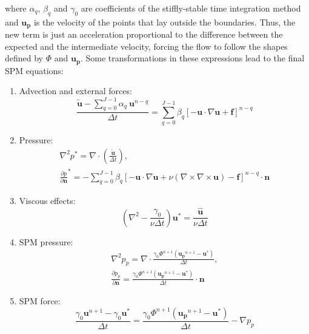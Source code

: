 where $\alpha_q$, $\beta_q$ and $\gamma_0$ are coefficients of the
stiffly-stable time integration method and $\mathbf{u_p}$ is the velocity of
the points that lay outside the boundaries. Thus, the new term is just an
acceleration proportional to the difference between the expected and the
intermediate velocity, forcing the flow to follow the shapes defined by $\Phi$
and $\mathbf{u_p}$. Some transformations in these expressions lead to the final
SPM equations:

\begin{enumerate}
    \item Advection and external forces:
        \begin{equation}
            \frac{\mathbf{\tilde{u}}-\sum_{q=0}^{J-1}\alpha_q~\mathbf{u}^{n-q}}
                {\Delta t} = \sum_{q=0}^{J-1}\beta_q\left[-\mathbf{u}\cdot
                \nabla\mathbf{u}+\mathbf{f}\right]^{n-q}
        \end{equation}
    \item Pressure:
        \begin{subequations}
        \begin{gather}
            \nabla^2 p^* = \nabla\cdot\left(\frac{\mathbf{\tilde{u}}}
                {\Delta t}\right),\\
            \frac{\partial p}{\partial\mathbf{n}}^* = -\sum_{q=0}^{J-1}\beta_q
                \left[-\mathbf{u}\cdot\nabla\mathbf{u}+\nu(\nabla\times\nabla
                \times\mathbf{u})-\mathbf{f}\right]^{n-q}\cdot\mathbf{n}
        \end{gather}
        \end{subequations}
    \item Viscous effects:
        \begin{equation}
            \left(\nabla^2 - \frac{\gamma_0}{\nu\Delta t}\right)\mathbf{u^*} =
                \frac{\mathbf{\hat{u}}}{\nu\Delta t}
        \end{equation}
    \item SPM pressure:
        \begin{subequations}
        \begin{gather}
            \nabla^2 p_p = \nabla\cdot\frac{\gamma_0\Phi^{n+1}(
                \mathbf{u_p}^{n+1}-\mathbf{u^*})}{\Delta t},\\[3mm]
            \frac{\partial p_p}{\partial\mathbf{n}} = \frac{\gamma_0\Phi^{n+1}
                (\mathbf{u_p}^{n+1}-\mathbf{u^*})}{\Delta t}\cdot\mathbf{n}
        \end{gather}
        \end{subequations}
    \item SPM force:
        \begin{equation} \label{eq:SPM:incompressiblePressure}
            \frac{\gamma_0\mathbf{u}^{n+1}-\gamma_0\mathbf{u^*}}{\Delta t} =
                \frac{\gamma_0\Phi^{n+1}(\mathbf{u_p}^{n+1}-\mathbf{u^*})}
                {\Delta t} - \nabla p_p
        \end{equation}
\end{enumerate}

